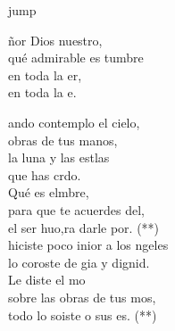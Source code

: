 \begin{cancion}jump\\
	\begin{chorus}%
		ñor Dios nuestro,\\
		qué admirable es tumbre\\
		en toda la er,\\
		en toda la e.\jump\\
	\end{chorus}%
	ando contemplo el cielo,\\
	\jump
obras de tus manos,\\
	la luna y las estlas\\
	que has crdo.\\
	\jump
	Qué es elmbre,\\
	para que te acuerdes del, \\
	el ser huo,ra darle por. (**)\\
	\jump
	 hiciste poco inior a los ngeles\\
	lo coroste de gia y dignid.\\
	Le diste el mo \\
	sobre las obras de tus mos,\\
	todo lo soiste o sus es. (**)\\
\end{cancion}%
